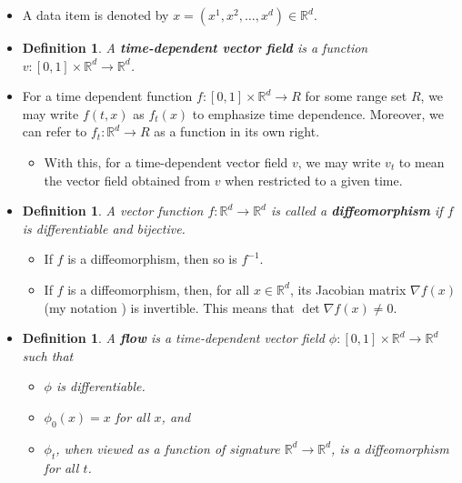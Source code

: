 \documentclass[10pt]{article}
\newtheorem{definition}[lemma]{Definition}
\newcommand{\ra}{\rightarrow}
\newcommand{\Real}{\mathbb{R}}
\begin{document}
\begin{itemize}
  \item A data item is denoted by $x = (x^1, x^2, \dotsc, x^d) \in \Real^d$.  

  \item \begin{definition} 
    A {\bf time-dependent vector field} is a function $v: [0,1] \times \Real^d \rightarrow \Real^d$. 
  \end{definition}

  \item For a time dependent function $f: [0,1] \times \Real^d \rightarrow R$ for some range set $R$, we may write $f(t,x)$ as $f_t(x)$ to emphasize time dependence. Moreover, we can refer to $f_t: \Real^d \rightarrow R$ as a function in its own right.
  \begin{itemize}
    \item With this, for a time-dependent vector field $v$, we may write $v_t$ to mean the vector field obtained from $v$ when restricted to a given time.
  \end{itemize}  

  \item \begin{definition}
    A vector function $f: \Real^d \ra \Real^d$ is called a {\bf diffeomorphism} if $f$ is differentiable and bijective.
  \end{definition}
  \begin{itemize}
    \item If $f$ is a diffeomorphism, then so is $f^{-1}$.
    \item If $f$ is a diffeomorphism, then, for all $x \in \Real^d$, its Jacobian matrix $\nabla f(x)$ (my notation \cite{Khungurn:Notation}) is invertible. This means that $\det \nabla f(x) \neq 0$. 
  \end{itemize}

  \item \begin{definition}
    A {\bf flow} is a time-dependent vector field $\phi: [0,1] \times \Real^d \ra \Real^d$ such that
    \begin{itemize}      
      \item $\phi$ is differentiable.
      \item $\phi_0(x) = x$ for all $x$, and
      \item $\phi_t$, when viewed as a function of signature $\Real^d \ra \Real^d$, is a diffeomorphism for all $t$.      
    \end{itemize}
  \end{definition}    
  

\end{itemize}
\end{document}
